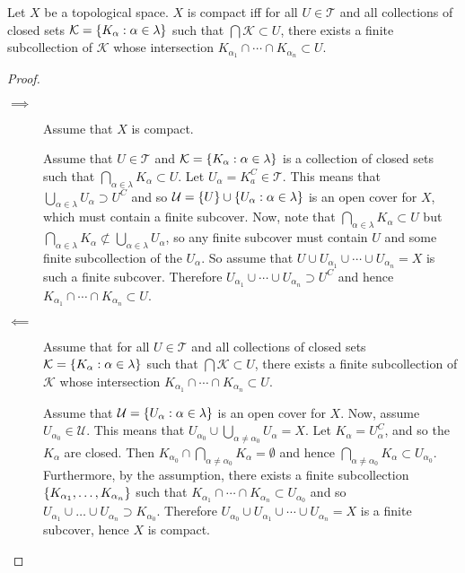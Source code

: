 \documentclass[letterpaper,12pt,fleqn]{article}
\newcommand{\U}{\mathcal{U}}
\renewcommand{\a}{\alpha}
\renewcommand{\l}{\lambda}
\newcommand{\T}{\mathscr{T}}
\newcommand{\K}{\mathcal{K}}
\begin{document}
\begin{theorem}[6.6]
  Let \(X\) be a topological space.  \(X\) is compact iff for all \(U\in\T\) and all collections of closed sets
  \(\K=\set{K_{\a}:\a\in\l}\) such that \(\bigcap\K\subset U\), there exists a finite subcollection of \(\K\)
  whose intersection \(K_{\a_1}\cap\cdots\cap K_{\a_n}\subset U\).
\end{theorem}

\begin{proof}
  \begin{description}
  \item[]
  \item[\(\implies\)] Assume that \(X\) is compact.

    Assume that \(U\in\T\) and \(\K=\set{K_{\a}:\a\in\l}\) is a collection of closed sets such that
    \(\bigcap_{\a\in\l}K_{\a}\subset U\).  Let \(U_{\a}=K_{a}^C\in\T\).  This means that
    \(\bigcup_{\a\in\l}U_{\a}\supset U^C\) and so \(\U=\set{U}\cup\set{U_{\a}:\a\in\l}\) is an open cover for \(X\),
    which must contain a finite subcover.  Now, note that \(\bigcap_{\a\in\l}K_{\a}\subset U\) but
    \(\bigcap_{\a\in\l}K_{\a}\not\subset\bigcup_{\a\in\l}U_{\a}\), so any finite subcover must contain \(U\) and some
    finite subcollection of the \(U_{\a}\).  So assume that \(U\cup U_{\a_1}\cup\cdots\cup U_{\a_n}=X\) is such a
    finite subcover.  Therefore \(U_{\a_1}\cup\cdots\cup U_{\a_n}\supset U^C\) and hence
    \(K_{\a_1}\cap\cdots\cap K_{\a_n}\subset U\).

  \item[\(\impliedby\)] Assume that for all \(U\in\T\) and all collections of closed sets \(\K=\set{K_{\a}:\a\in\l}\)
    such that \(\bigcap\K\subset U\), there exists a finite subcollection of \(\K\) whose intersection
    \(K_{\a_1}\cap\cdots\cap K_{\a_n}\subset U\).

    Assume that \(\U=\set{U_{\a}:\a\in\l}\) is an open cover for \(X\).  Now, assume \(U_{\a_0}\in\U\).  This means
    that \(U_{\a_0}\cup\bigcup_{\a\ne\a_0}U_{\a}=X\).  Let \(K_{\a}=U_{\a}^C\), and so the \(K_{\a}\) are closed.  Then
    \(K_{\a_0}\cap\bigcap_{\a\ne\a_0}K_{\a}=\emptyset\) and hence \(\bigcap_{\a\ne\a_0}K_{\a}\subset U_{\a_0}\).
    Furthermore, by the assumption, there exists a finite subcollection \(\set{K_{\a_1},\ldots,K_{\a_n}}\) such that
    \(K_{\a_1}\cap\cdots\cap K_{\a_n}\subset U_{\a_0}\) and so \(U_{\a_1}\cup\ldots\cup U_{\a_n}\supset K_{\a_0}\).
    Therefore \(U_{\a_0}\cup U_{\a_1}\cup\cdots\cup U_{\a_n}=X\) is a finite subcover, hence \(X\) is compact.
  \end{description}
\end{proof}
\end{document}
